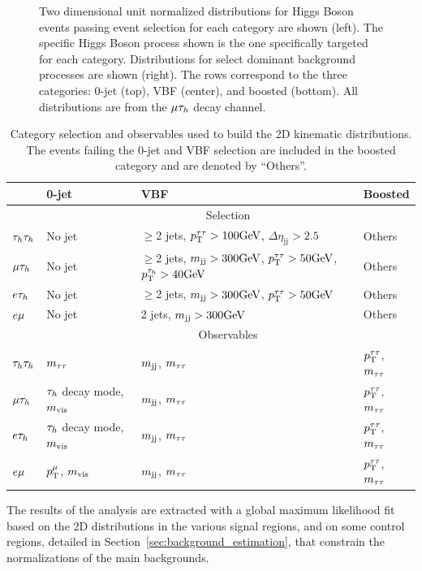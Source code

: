 \begin{figure}[htbp]
     \caption{Two dimensional unit normalized distributions for Higgs Boson events passing event selection 
for each category are shown (left). The specific Higgs Boson process shown is the one 
specifically targeted for each category. Distributions for select dominant background 
processes are shown (right). The rows correspond to the three categories: 0-jet (top), 
VBF (center), and boosted (bottom).  All distributions are from the $\mu\tau_{h}$ decay channel.} 
\end{figure}


\begin{table}
\centering
\begin{small}
\begin{tabular}{llll}
 & 0-jet & VBF & Boosted \\
\hline
 & \multicolumn{3}{c}{Selection} \\ \cline{2-4}
$\tau_{h}\tau_{h}$ & No jet &  \scriptsize{$\geq$2 jets, $p_\mathrm{T}^{\tau\tau}>100\mathrm{GeV}$, $\Delta\eta_{\mathrm{jj}}>2.5$} & Others\\
$\mu\tau_{h}$ & No jet &  \scriptsize{$\geq$2 jets, $m_\mathrm{jj}>300\mathrm{GeV}$, $p_\mathrm{T}^{\tau\tau}>50\mathrm{GeV}$, $p_\mathrm{T}^{\tau_{h}}>40\mathrm{GeV}$} & Others\\
$e\tau_{h}$ & No jet &  \scriptsize{$\geq$2 jets, $m_\mathrm{jj}>300\mathrm{GeV}$, $p_\mathrm{T}^{\tau\tau}>50\mathrm{GeV}$} & Others\\
$e\mu$ & No jet & \scriptsize{2 jets, $m_\mathrm{jj}>300\mathrm{GeV}$} & Others \\
\hline
 & \multicolumn{3}{c}{Observables}\\ \cline{2-4}
$\tau_{h}\tau_{h}$ & $m_{\tau\tau}$                 &    $m_\mathrm{jj}$, $m_{\tau\tau}$  &   $p_\mathrm{T}^{\tau\tau}$, $m_{\tau\tau}$  \\
$\mu\tau_{h}$ & $\tau_{h}$ decay mode, $m_\text{vis}$   &    $m_\mathrm{jj}$, $m_{\tau\tau}$  &  $p_\mathrm{T}^{\tau\tau}$, $m_{\tau\tau}$  \\
$e\tau_{h}$ & $\tau_{h}$ decay mode, $m_\text{vis}$   &    $m_\mathrm{jj}$, $m_{\tau\tau}$  &  $p_\mathrm{T}^{\tau\tau}$, $m_{\tau\tau}$ \\
$e\mu$ & $p_\mathrm{T}^{\mu}$, $m_\text{vis}$   &     $m_\mathrm{jj}$, $m_{\tau\tau}$  &   $p_\mathrm{T}^{\tau\tau}$, $m_{\tau\tau}$  \\
\hline
\end{tabular}
\caption{ Category selection and observables used to build the 2D kinematic distributions. 
The events failing the 0-jet and VBF selection are included in the boosted category and are
denoted by ``Others''.
\label{tab:htt_categories}
}
\end{small}
\end{table}

The results of the analysis are extracted with a global maximum likelihood fit based on  the 2D distributions in the various signal regions, and on some control regions, detailed in Section~\ref{sec:background_estimation}, that constrain the normalizations of the main backgrounds.


